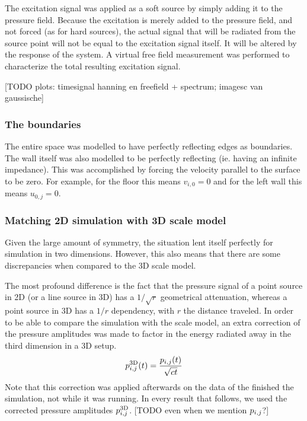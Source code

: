 The excitation signal was applied as a soft source\cite{Comparison of FDTD hard source with FDTD soft source} by simply adding it to the pressure field. Because the excitation is merely added to the pressure field, and not forced (as for hard sources), the actual signal that will be radiated from the source point will not be equal to the excitation signal itself. It will be altered by the response of the system. A virtual free field measurement was performed to characterize the total resulting excitation signal.

[TODO plots: timesignal hanning en freefield + spectrum; imagesc van gaussische]


\subsubsection*{The boundaries}
The entire space was modelled to have perfectly reflecting edges as boundaries. The wall itself was also modelled to be perfectly reflecting (ie. having an infinite impedance). This was accomplished by forcing the velocity parallel to the surface to be zero. For example, for the floor this means $v_{i,0} = 0$ and for the left wall this means $u_{0,j} = 0$.



\subsubsection*{Matching 2D simulation with 3D scale model}
Given the large amount of symmetry, the situation lent itself perfectly for simulation in two dimensions. However, this also means that there are some discrepancies when compared to the 3D scale model.

The most profound difference is the fact that the pressure signal of a point source in 2D (or a line source in 3D) has a $1/\sqrt{r}$ geometrical attenuation, whereas a point source in 3D has a $1/r$ dependency, with $r$ the distance traveled. In order to be able to compare the simulation with the scale model, an extra correction of the pressure amplitudes was made to factor in the energy radiated away in the third dimension in a 3D setup.
$$
p_{i,j}^{\mathrm{3D}}(t) = \frac{p_{i,j}(t)}{\sqrt{ct}}
$$
Note that this correction was applied afterwards on the data of the finished the simulation, not while it was running. In every result that follows, we used the corrected pressure amplitudes $p_{i,j}^{\mathrm{3D}}$. [TODO even when we mention $p_{i,j}$?]




